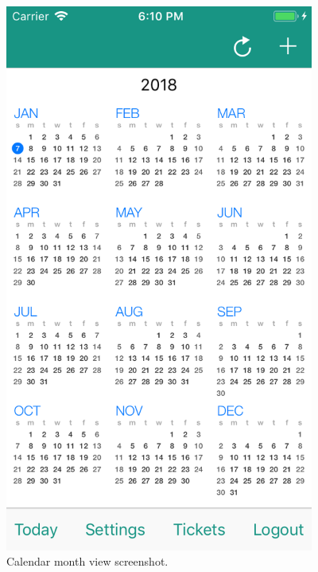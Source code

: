 \begin{figure}
	\centering
	\includegraphics[width=4in]{./screenshots/iOSmonthview.png}
	\caption{Calendar month view screenshot.}
	\label{fig:iosmonthview}
\end{figure}


